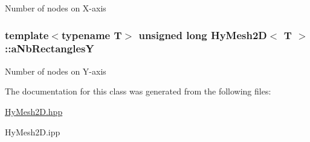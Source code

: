 \label{classHyMesh2D_a53430a7d9168ad8e9392252b87e139eb}
Number of nodes on X-\/axis \hypertarget{classHyMesh2D_a836a8033b37ffdb7103510eabb1b3055}{
\subsubsection[{aNbRectanglesY}]{\setlength{\rightskip}{0pt plus 5cm}template$<$typename T$>$ unsigned long {\bf HyMesh2D}$<$ T $>$::{\bf aNbRectanglesY}}}
\label{classHyMesh2D_a836a8033b37ffdb7103510eabb1b3055}
Number of nodes on Y-\/axis 

The documentation for this class was generated from the following files:\begin{DoxyCompactItemize}
\item 
\hyperlink{HyMesh2D_8hpp}{HyMesh2D.hpp}\item 
HyMesh2D.ipp\end{DoxyCompactItemize}

